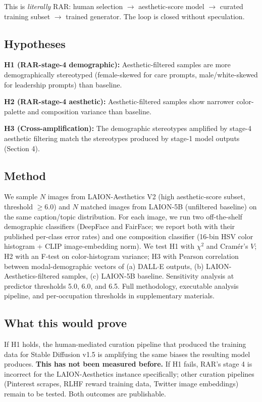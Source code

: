 \documentclass[sigconf,nonacm]{acmart}
\begin{document}
This is \emph{literally} RAR: human selection \(\rightarrow\) aesthetic-score model \(\rightarrow\) curated training subset \(\rightarrow\) trained generator. The loop is closed without speculation.

\subsection{Hypotheses}

\textbf{H1 (RAR-stage-4 demographic):} Aesthetic-filtered samples are more demographically stereotyped (female-skewed for care prompts, male/white-skewed for leadership prompts) than baseline.

\textbf{H2 (RAR-stage-4 aesthetic):} Aesthetic-filtered samples show narrower color-palette and composition variance than baseline.

\textbf{H3 (Cross-amplification):} The demographic stereotypes amplified by stage-4 aesthetic filtering match the stereotypes produced by stage-1 model outputs (Section 4).

\subsection{Method}

We sample \(N\) images from LAION-Aesthetics V2 (high aesthetic-score subset, threshold \(\geq 6.0\)) and \(N\) matched images from LAION-5B (unfiltered baseline) on the same caption/topic distribution. For each image, we run two off-the-shelf demographic classifiers (DeepFace and FairFace; we report both with their published per-class error rates) and one composition classifier (16-bin HSV color histogram + CLIP image-embedding norm). We test H1 with \(\chi^2\) and Cramér's \(V\); H2 with an F-test on color-histogram variance; H3 with Pearson correlation between modal-demographic vectors of (a) DALL$\cdot$E outputs, (b) LAION-Aesthetics-filtered samples, (c) LAION-5B baseline. Sensitivity analysis at predictor thresholds 5.0, 6.0, and 6.5. Full methodology, executable analysis pipeline, and per-occupation thresholds in supplementary materials.

\subsection{What this would prove}

If H1 holds, the human-mediated curation pipeline that produced the training data for Stable Diffusion v1.5 is amplifying the same biases the resulting model produces. \textbf{This has not been measured before.} If H1 fails, RAR's stage 4 is incorrect for the LAION-Aesthetics instance specifically; other curation pipelines (Pinterest scrapes, RLHF reward training data, Twitter image embeddings) remain to be tested. Both outcomes are publishable.
\end{document}
